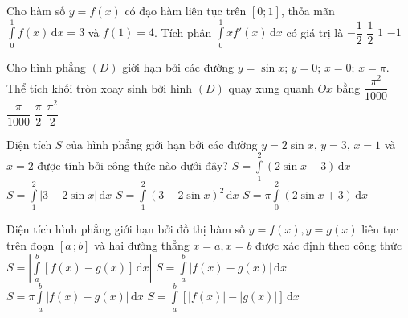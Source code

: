 \begin{ex}%
Cho hàm số $y=f(x)$ có đạo hàm liên tục trên $[0;1]$, thỏa mãn $\displaystyle\int\limits_0^1{f(x)\mathrm{\,d}x=3}$ và $f(1)=4$. Tích phân $\displaystyle\int\limits_0^1{xf'(x)\mathrm{\,d}x}$ có giá trị là
\choice
{$-\dfrac{1}{2}$}
{$\dfrac{1}{2}$}
{\True $1$}
{$-1$}
\end{ex}

\begin{ex}%
Cho hình phẳng $(D)$ giới hạn bởi các đường $ y=\sin x$; $ y=0$; $ x=0$; $ x=\pi $. Thể tích khối tròn xoay sinh bởi hình $(D)$ quay xung quanh $ Ox$ bằng
\choice
{$\dfrac{\pi ^2}{1000}$}
{$\dfrac{\pi}{1000}$}
{$\dfrac{\pi}{2}$}
{\True $\dfrac{\pi ^2}{2}$}
\end{ex}

\begin{ex}%
Diện tích $S$ của hình phẳng giới hạn bởi các đường $y=2\sin x$, $y=3$, $x=1$ và $x=2$ được tính bởi công thức nào dưới đây?
\choice
{$S=\displaystyle\int\limits_1^2(2\sin x-3)\mathrm{\,d}x$}
{\True $S=\displaystyle\int\limits_1^2|3-2\sin x|\mathrm{\,d}x$}
{$S=\displaystyle\int\limits_1^2(3-2\sin x)^2\mathrm{\,d}x$}
{$S=\pi\displaystyle\int\limits_0^2(2\sin x+3)\mathrm{\,d}x$}
\end{ex}

\begin{ex}%

Diện tích hình phẳng giới hạn bởi đồ thị hàm số $y=f\left( x \right),y=g\left( x \right)$ liên tục trên đoạn $\left[ a\,;b \right]$ và hai đường thẳng $x=a,x=b$ được xác định theo công thức
\choice
{ $S=\left| \int\limits_a^b{\left[ f\left( x \right)-g\left( x \right) \right]\mathrm{\,d}x} \right|$}
{\True $S=\int\limits_a^b{\left| f\left( x \right)-g\left( x \right) \right|\mathrm{\,d}x}$}
{ $S=\pi \int\limits_a^b{\left| f\left( x \right)-g\left( x \right) \right|\mathrm{\,d}x}$}
{ $S=\int\limits_a^b{\left[ \left| f\left( x \right) \right|-\left| g\left( x \right) \right| \right]\mathrm{\,d}x}$}
\end{ex}


